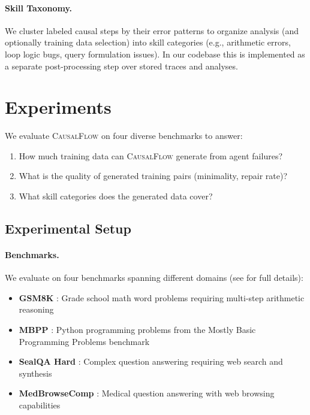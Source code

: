 \documentclass{article}
\theoremstyle{plain}
\theoremstyle{definition}
\theoremstyle{remark}
\begin{document}
\paragraph{Skill Taxonomy.} We cluster labeled causal steps by their error patterns to organize analysis (and optionally training data selection) into skill categories (e.g., arithmetic errors, loop logic bugs, query formulation issues). In our codebase this is implemented as a separate post-processing step over stored traces and analyses.


\section{Experiments}

We evaluate \textsc{CausalFlow} on four diverse benchmarks to answer:
\begin{enumerate}
    \item[\textbf{Q1}] How much training data can \textsc{CausalFlow} generate from agent failures?
    \item[\textbf{Q2}] What is the quality of generated training pairs (minimality, repair rate)?
    \item[\textbf{Q3}] What skill categories does the generated data cover?
\end{enumerate}

\subsection{Experimental Setup}

\paragraph{Benchmarks.}
We evaluate on four benchmarks spanning different domains (see  for full details):
\begin{itemize}
    \item \textbf{GSM8K} \cite{cobbe2021gsm8k}: Grade school math word problems requiring multi-step arithmetic reasoning
    \item \textbf{MBPP} \cite{austin2021program}: Python programming problems from the Mostly Basic Programming Problems benchmark
    \item \textbf{SealQA Hard} \cite{pham2025sealqa}: Complex question answering requiring web search and synthesis
    \item \textbf{MedBrowseComp} \cite{chen2025medbrowsecomp}: Medical question answering with web browsing capabilities
\end{itemize}
\end{document}
